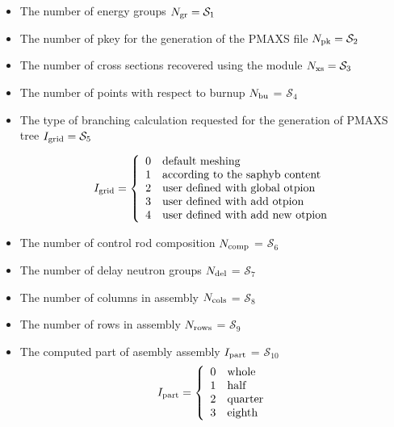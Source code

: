 \begin{itemize}

\item The number of energy groups $N_{\rm gr} = \mathcal{S}_1$

\item The number of pkey for the generation of the PMAXS file $N_{\rm pk} = \mathcal{S}_2$

\item The number of cross sections recovered using the  module $N_{\rm xs} = \mathcal{S}_3$

\item The number of points with respect to burnup $N_{\rm bu}$ = $\mathcal{S}_4$

\item The type of branching calculation requested for the generation of PMAXS tree $I_{\rm grid} = \mathcal{S}_5$

\begin{displaymath} I_{\rm grid} = \left\{
\begin{array}{rl}
 0 & \textrm{default meshing} \\
 1 & \textrm{according to the saphyb content} \\
 2 & \textrm{user defined with global otpion} \\
 3 & \textrm{user defined with add otpion} \\
 4 & \textrm{user defined with add new otpion} \\
\end{array} \right.
\end{displaymath}

\item The number of control rod composition $N_{\rm comp}$ = $\mathcal{S}_6$
\item The number of delay neutron groups $N_{\rm del}$ = $\mathcal{S}_7$
\item The number of columns in assembly $N_{\rm cols}$ = $\mathcal{S}_8$
\item The number of rows in assembly $N_{\rm rows}$ = $\mathcal{S}_9$
\item The computed part of asembly assembly $I_{\rm part}$ = $\mathcal{S}_{10}$
\begin{displaymath} I_{\rm part} = \left\{
\begin{array}{rl}
 0 & \textrm{whole} \\
 1 & \textrm{half} \\
 2 & \textrm{quarter} \\
 3 & \textrm{eighth} \\ 
\end{array} \right.
\end{displaymath}


\end{itemize}
